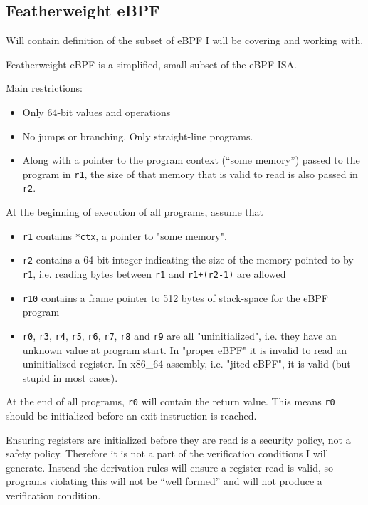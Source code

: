 \subsection{Featherweight eBPF}
\label{subsec:featherweight_ebpf}
Will contain definition of the subset of eBPF I will be covering and working with.


Featherweight-eBPF is a simplified, small subset of the eBPF ISA.

Main restrictions:
\begin{itemize}
\item Only 64-bit values and operations
\item No jumps or branching. Only straight-line programs.
\item Along with a pointer to the program context (``some memory'') passed to the program in \texttt{r1}, the size of that memory that is valid to read is also passed in \texttt{r2}. 
\end{itemize}


At the beginning of execution of all programs, assume that
\begin{itemize}
\item \texttt{r1} contains \texttt{*ctx}, a pointer to "some memory".
\item \texttt{r2} contains a 64-bit integer indicating the size of the memory pointed to by \texttt{r1}, i.e. reading bytes between \texttt{r1} and \texttt{r1+(r2-1)} are allowed
\item \texttt{r10} contains a frame pointer to 512 bytes of stack-space for the eBPF program
\item \texttt{r0}, \texttt{r3}, \texttt{r4}, \texttt{r5}, \texttt{r6}, \texttt{r7}, \texttt{r8} and \texttt{r9} are all "uninitialized", i.e. they have an unknown value at program start. In "proper eBPF" it is invalid to read an uninitialized register. In x86\_64 assembly, i.e. "jited eBPF", it is valid (but stupid in most cases).

\end{itemize}

At the end of all programs, \texttt{r0} will contain the return value. 
This means \texttt{r0} should be initialized before an exit-instruction is reached.

Ensuring registers are initialized before they are read is a security policy, not a safety policy.
Therefore it is not a part of the verification conditions I will generate. Instead the derivation rules will ensure a register read is valid, so programs violating this will not be ``well formed'' and will not produce a verification condition. 

